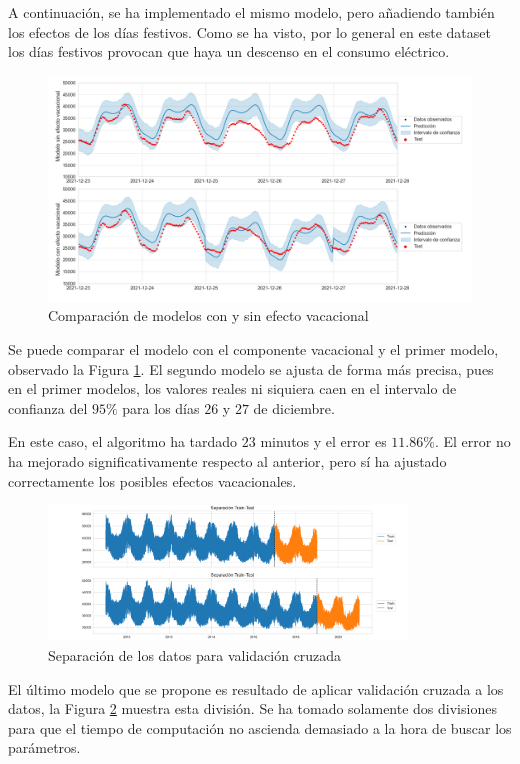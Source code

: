 \documentclass[12pt,twoside]{article}
\begin{document}
A continuación, se ha implementado el mismo modelo, pero añadiendo también los efectos de los días festivos. Como se ha visto, por lo general en este dataset los días festivos provocan que haya un descenso en el consumo eléctrico. 
\begin{figure}[h]
\centering
    \includegraphics[width = 0.8
    \textwidth]{imagenes/prophet_hdaycomparison.png}
    \caption{Comparación de modelos con y sin efecto vacacional}\label{fig:prophet_hdaycomparison}
\end{figure}

Se puede comparar el modelo con el componente vacacional y el primer modelo, observado la Figura \ref{fig:prophet_hdaycomparison}. El segundo modelo se ajusta de forma más precisa, pues en el primer modelos, los valores reales ni siquiera caen en el intervalo de confianza del $95\%$ para los días $26$ y $27$ de diciembre.

En este caso, el algoritmo ha tardado $23$ minutos y el error es $11.86\%$. El error no ha mejorado significativamente respecto al anterior, pero sí ha ajustado correctamente los posibles efectos vacacionales.
\begin{figure}[h]
\centering
    \includegraphics[width = 0.85\textwidth]{imagenes/prophet_crossval.png}
    \caption{Separación de los datos para validación cruzada}\label{fig:prophet_crossval}
\end{figure}


El último modelo que se propone es resultado de aplicar validación cruzada a los datos, la Figura \ref{fig:prophet_crossval} muestra esta división. Se ha tomado solamente dos divisiones para que el tiempo de computación no ascienda demasiado a la hora de buscar los parámetros.
\end{document}
